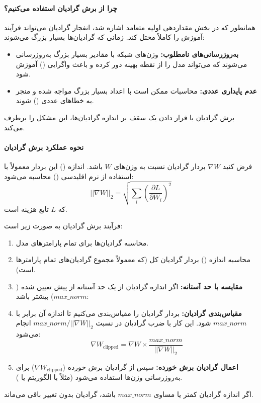 \documentclass{article}
\begin{document}
\paragraph{چرا از برش گرادیان استفاده می‌کنیم؟}
همانطور که در بخش مقداردهی اولیه متعامد اشاره شد، انفجار گرادیان می‌تواند فرآیند آموزش را کاملاً مختل کند. زمانی که گرادیان‌ها بسیار بزرگ می‌شوند:
\begin{itemize}
	\item \textbf{به‌روزرسانی‌های نامطلوب:} وزن‌های شبکه با مقادیر بسیار بزرگ به‌روزرسانی می‌شوند که می‌تواند مدل را از نقطه بهینه دور کرده و باعث واگرایی () آموزش شود.
	\item \textbf{عدم پایداری عددی:} محاسبات ممکن است با اعداد بسیار بزرگ مواجه شده و منجر به خطاهای عددی () شوند.
\end{itemize}
برش گرادیان با قرار دادن یک سقف بر اندازه گرادیان‌ها، این مشکل را برطرف می‌کند.

\paragraph{نحوه عملکرد برش گرادیان}
فرض کنید \(\nabla W\) بردار گرادیان نسبت به وزن‌های \(W\) باشد. اندازه () این بردار معمولاً با استفاده از نرم اقلیدسی () محاسبه می‌شود:
\begin{equation}
	||\nabla W||_2 = \sqrt{\sum_i (\frac{\partial L}{\partial W_i})^2}
\end{equation}
که \(L\) تابع هزینه است.

فرآیند برش گرادیان به صورت زیر است:
\begin{enumerate}
	\item محاسبه گرادیان‌ها برای تمام پارامترهای مدل.
	\item محاسبه اندازه () بردار گرادیان کل (که معمولاً مجموع گرادیان‌های تمام پارامترها است).
	\item \textbf{مقایسه با حد آستانه:} اگر اندازه گرادیان از یک حد آستانه از پیش تعیین شده (\(max\_norm\)) بیشتر باشد:
	\item \textbf{مقیاس‌بندی گرادیان:} بردار گرادیان را مقیاس‌بندی می‌کنیم تا اندازه آن برابر با \(max\_norm\) شود. این کار با ضرب گرادیان در نسبت \(max\_norm / ||\nabla W||_2\) انجام می‌شود:
	\begin{equation}
		\nabla W_{\text{clipped}} = \nabla W \times \frac{max\_norm}{||\nabla W||_2}
	\end{equation}
	\item \textbf{اعمال گرادیان برش خورده:} سپس از گرادیان برش خورده (\(\nabla W_{\text{clipped}}\)) برای به‌روزرسانی وزن‌ها استفاده می‌شود (مثلاً با الگوریتم  یا ).
\end{enumerate}
اگر اندازه گرادیان کمتر یا مساوی \(max\_norm\) باشد، گرادیان بدون تغییر باقی می‌ماند.
\end{document}
